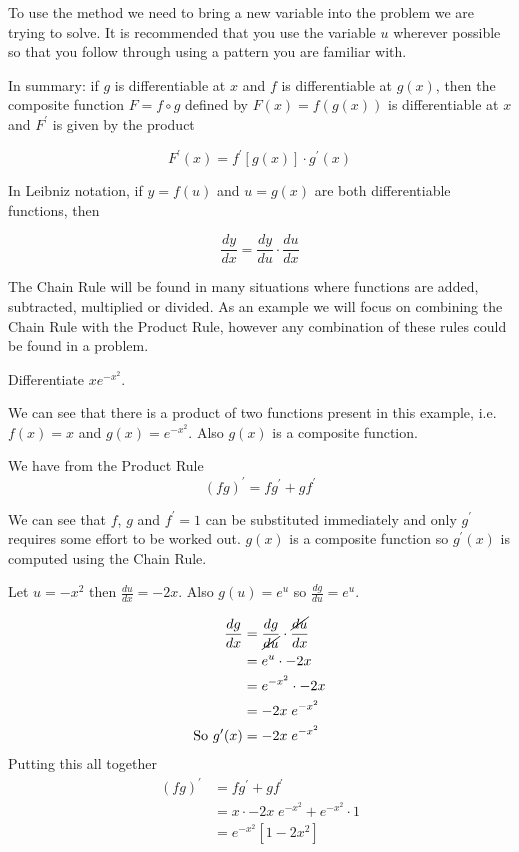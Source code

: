 To use the method we need to bring a new variable into the problem we are trying to solve. It
is recommended that you use the variable $u$ wherever possible so that you follow through using a pattern you are familiar with.

In summary: if $g$ is differentiable at $x$ and $f$ is differentiable at $g (x)$, then the composite function $F =f \circ g$ defined by $F (x) =f (g (x))$ is differentiable at $x$ and $F^{ \prime }$ is given by the product
\begin{tcolorbox}
\[F^{ \prime } (x) =f^{ \prime } [g (x)] \cdot g^{ \prime } (x)\]
\end{tcolorbox}
In Leibniz notation, if $y =f (u)$ and $u =g (x)$ are both differentiable functions, then
\begin{tcolorbox}
\[\frac{d y}{d x} =\frac{d y}{d u} \cdot \frac{d u}{d x}\]
\end{tcolorbox}

The Chain Rule will be found in many situations where functions are added, subtracted, multiplied or divided. As an example we will focus on combining the Chain Rule with the Product Rule, however any combination of these rules could be found in a problem.

\example Differentiate $\displaystyle xe^{-x^2}$.

\solution We can see that there is a product of two functions present in this example, i.e. $f (x) =x$ and $g (x) =e^{ -x^{2}}$. Also $g (x)$ is a composite function.

We have from the Product Rule
\begin{equation*}\left (f g\right )^{ \prime } =f g^{ \prime } +g f^{ \prime }
\end{equation*}

We can see that $f$, $g$ and $f^{ \prime }=1$ can be substituted immediately and only $g^{ \prime }$ requires some effort to be worked out. $g (x)$ is a composite function so $g^{ \prime } (x)$ is computed using the Chain Rule.

Let $u = -x^{2}$ then $\frac{d u}{d x} = -2 x$. Also $g (u) =e^{u}$ so $\frac{d g}{d u} =e^{u}$.
\begin{multicols}{2}
\begin{align*}\frac{d g}{d x} &  = \frac{d g}{\cancel{d u}}\cdot \frac{\cancel{d u}}{d x} \\
 &  = e^{u} \cdot  -2 x \\
 &  = e^{ -x^{2}} \cdot  -2 x \\
 &  =  -2 x\; e^{ -x^{2}} \\
\text{So }g^{ \prime } (x) &  =  -2 x\; e^{ -x^{2}}\end{align*}
Putting this all together
\begin{align*}\left (f g\right )^{ \prime } &  = f g^{ \prime } +g f^{ \prime } \\
 &  = x \cdot  -2 x\; e^{ -x^{2}} +e^{ -x^{2}} \cdot 1 \\
 &  = e^{ -x^{2}} \left [1 -2 x^{2}\right ]\end{align*}
\end{multicols}

